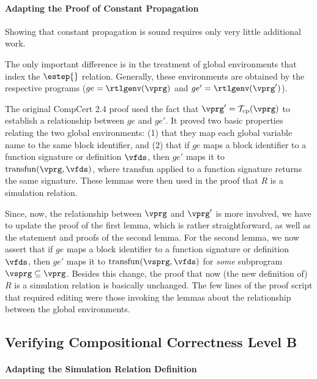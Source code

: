 \paragraph{Adapting the Proof of Constant Propagation}

Showing that constant propagation is sound requires only very little additional work.

The only important difference is in the treatment of global environments that index the $\estep{}$ relation.
Generally, these environments are obtained by the respective programs ($ge=\rtlgenv(\vprg)$ and $ge'=\rtlgenv(\vprg')$). 

The original CompCert 2.4 proof used the fact that
$\vprg'=\mathcal{T}_{\rm cp}(\vprg)$ to establish a relationship
between $ge$ and $ge'$.  It proved two basic properties relating the
two global environments: (1) that they map each global variable name
to the same block identifier, and (2) that if $ge$ maps a block
identifier to a function signature or definition $\vfds$, then $ge'$
maps it to $\mathrm{transfun}(\vprg,\vfds)$, where $\mathrm{transfun}$
applied to a function signature returns the same signature.  These
lemmas were then used in the proof that $R$ is a simulation relation.

Since, now, the relationship between $\vprg$ and $\vprg'$ is more involved, 
we have to update the proof of the first lemma, which is rather straightforward,
as well as the statement and proofs of the second lemma.
For the second lemma, we now assert that 
if $ge$ maps a block identifier to a function signature or definition $\vfds$, 
then $ge'$ maps it to $\mathrm{transfun}(\vsprg,\vfds)$ for \emph{some} subprogram $\vsprg\subseteq\vprg$.
Besides this change, 
the proof that now (the new definition of) $R$ is a simulation relation is basically unchanged.
The few lines of the proof script that required editing were those invoking the lemmas about the relationship between the global environments.


\subsection{Verifying Compositional Correctness Level B}

\paragraph{Adapting the Simulation Relation Definition}

